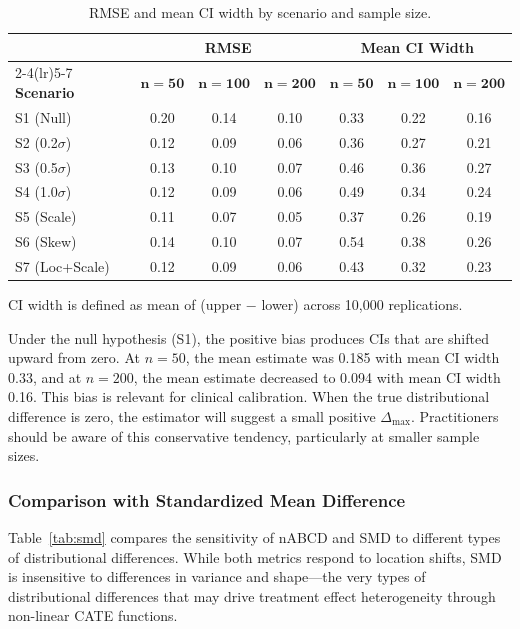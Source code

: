 \documentclass[AMA,Times1COL]{WileyNJDv5}
\begin{document}
\begin{table}[ht]
\centering
\caption{RMSE and mean CI width by scenario and sample size.\label{tab:precision}}
\begin{tabular}{lcccccc}
\toprule
& \multicolumn{3}{c}{\textbf{RMSE}} & \multicolumn{3}{c}{\textbf{Mean CI Width}} \\
\cmidrule(lr){2-4}\cmidrule(lr){5-7}
\textbf{Scenario} & $\boldsymbol{n=50}$ & $\boldsymbol{n=100}$ & $\boldsymbol{n=200}$ & $\boldsymbol{n=50}$ & $\boldsymbol{n=100}$ & $\boldsymbol{n=200}$ \\
\midrule
S1 (Null) & 0.20 & 0.14 & 0.10 & 0.33 & 0.22 & 0.16 \\
S2 (0.2$\sigma$) & 0.12 & 0.09 & 0.06 & 0.36 & 0.27 & 0.21 \\
S3 (0.5$\sigma$) & 0.13 & 0.10 & 0.07 & 0.46 & 0.36 & 0.27 \\
S4 (1.0$\sigma$) & 0.12 & 0.09 & 0.06 & 0.49 & 0.34 & 0.24 \\
S5 (Scale) & 0.11 & 0.07 & 0.05 & 0.37 & 0.26 & 0.19 \\
S6 (Skew) & 0.14 & 0.10 & 0.07 & 0.54 & 0.38 & 0.26 \\
S7 (Loc+Scale) & 0.12 & 0.09 & 0.06 & 0.43 & 0.32 & 0.23 \\
\bottomrule
\end{tabular}
\begin{tablenotes}
\item CI width is defined as mean of (upper $-$ lower) across 10{,}000 replications.
\end{tablenotes}
\end{table}

Under the null hypothesis (S1), the positive bias produces CIs that are shifted upward from zero. At $n = 50$, the mean estimate was 0.185 with mean CI width 0.33, and at $n = 200$, the mean estimate decreased to 0.094 with mean CI width 0.16. This bias is relevant for clinical calibration. When the true distributional difference is zero, the estimator will suggest a small positive $\Delta_{\max}$. Practitioners should be aware of this conservative tendency, particularly at smaller sample sizes.

\subsubsection{Comparison with Standardized Mean Difference}

Table~\ref{tab:smd} compares the sensitivity of nABCD and SMD to different types of distributional differences. While both metrics respond to location shifts, SMD is insensitive to differences in variance and shape---the very types of distributional differences that may drive treatment effect heterogeneity through non-linear CATE functions.
\end{document}
